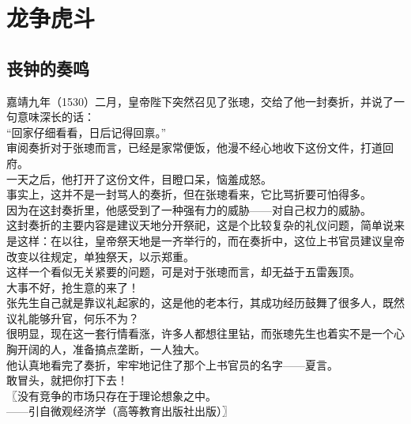 \section{龙争虎斗}
\ifnum{}
	\begin{multicols}{\theparacolNo}
\fi
\subsection{丧钟的奏鸣}
嘉靖九年（1530）二月，皇帝陛下突然召见了张璁，交给了他一封奏折，并说了一句意味深长的话：\\

“回家仔细看看，日后记得回禀。”\\

审阅奏折对于张璁而言，已经是家常便饭，他漫不经心地收下这份文件，打道回府。\\

一天之后，他打开了这份文件，目瞪口呆，恼羞成怒。\\

事实上，这并不是一封骂人的奏折，但在张璁看来，它比骂折要可怕得多。\\

因为在这封奏折里，他感受到了一种强有力的威胁——对自己权力的威胁。\\

这封奏折的主要内容是建议天地分开祭祀，这是个比较复杂的礼仪问题，简单说来是这样：在以往，皇帝祭天地是一齐举行的，而在奏折中，这位上书官员建议皇帝改变以往规定，单独祭天，以示郑重。\\

这样一个看似无关紧要的问题，可是对于张璁而言，却无益于五雷轰顶。\\

大事不好，抢生意的来了！\\

张先生自己就是靠议礼起家的，这是他的老本行，其成功经历鼓舞了很多人，既然议礼能够升官，何乐不为？\\

很明显，现在这一套行情看涨，许多人都想往里钻，而张璁先生也着实不是一个心胸开阔的人，准备搞点垄断，一人独大。\\

他认真地看完了奏折，牢牢地记住了那个上书官员的名字——夏言。\\

敢冒头，就把你打下去！\\

〖没有竞争的市场只存在于理论想象之中。\\

——引自微观经济学（高等教育出版社出版）〗\\


\end{multicols}
